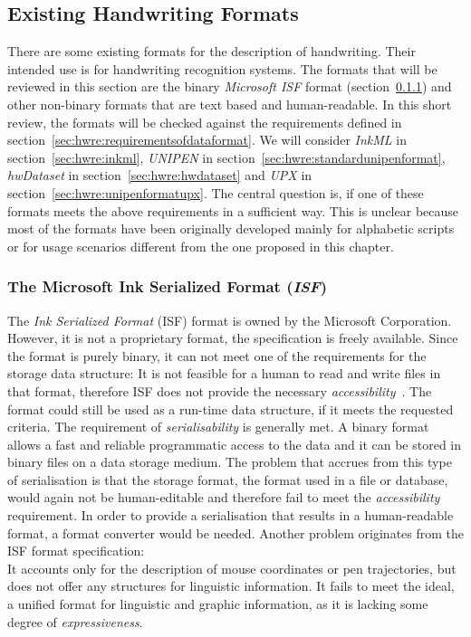 

\subsection{Existing Handwriting Formats}
\label{sec:hwre:existingformats}

There are some existing formats for the description of handwriting.
Their intended use is for handwriting recognition systems.
The formats that will be reviewed in this section are the 
binary \emph{Microsoft ISF} format (section~\ref{sec:hwre:msisfformat})
and other non-binary formats that are text based and human-readable.
In this short review, the formats will be checked against the 
requirements defined in section~\ref{sec:hwre:requirementsofdataformat}. 
We will consider 
\emph{InkML} in section~\ref{sec:hwre:inkml}, 
\emph{UNIPEN} in section~\ref{sec:hwre:standardunipenformat}, 
\emph{hwDataset} in section~\ref{sec:hwre:hwdataset} and 
\emph{UPX} in section~\ref{sec:hwre:unipenformatupx}.
The central question is, if one of these formats meets the above requirements in 
a sufficient way. This is unclear because most of the formats have been 
originally developed mainly for alphabetic scripts or for usage scenarios 
different from the one proposed in this chapter.

\subsubsection{The Microsoft Ink Serialized Format (\emph{ISF})}
\label{sec:hwre:msisfformat}

The \emph{Ink Serialized Format} (ISF) format is owned by the 
Microsoft Corporation. However, it is not a proprietary format, the 
specification is freely available. Since the format is purely binary, 
it can not meet one of the requirements for the storage data structure:
It is not feasible for a human to read and write files in that format,
therefore ISF does not provide the necessary 
\emph{accessibility}~. The format could still be used 
as a run-time data structure, if it meets the requested criteria.
The requirement of \emph{serialisability} is generally met. A binary format 
allows a fast and reliable programmatic access to the data and it can be stored
in binary files on a data storage medium. The problem that accrues from this 
type of serialisation is that the storage format, the format used in a file or 
database, would again not be human-editable and therefore fail to meet the 
\emph{accessibility} requirement.
In order to provide a serialisation that results in a human-readable format, 
a format converter would be needed. Another problem originates from the 
ISF format specification: \\
It accounts only for the description of mouse coordinates or pen trajectories, 
but does not offer any structures for linguistic information.
It fails to meet the ideal, a unified format for linguistic and graphic 
information, as it is lacking some degree of \emph{expressiveness}.

